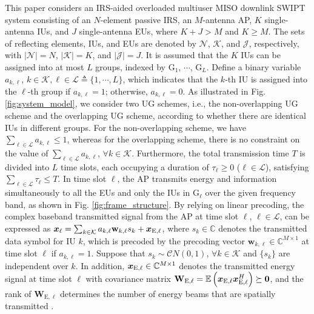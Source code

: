 \documentclass[12pt,draftclsnofoot, onecolumn]{IEEEtran}
\newcommand{\bm}[1]{\mbox{\boldmath{$#1$}}}
\theoremstyle{plain}
\begin{document}
\begin{sloppypar}
This paper considers an IRS-aided overloaded multiuser MISO downlink SWIPT system consisting of an $N$-element passive IRS, an $M$-antenna AP, $K$ single-antenna IUs, and $J$ single-antenna EUs, where $K + J > M$ and $K \geq M$. The sets of reflecting elements, IUs, and EUs are denoted by $\mathcal N$, $\mathcal K$, and $\mathcal J$, respectively, with $\left|\mathcal N\right| = N$, $\left|\mathcal K\right| = K$, and $\left|\mathcal J\right| = J$. It is assumed that the $K$ IUs can be assigned into at most $L$ groups, indexed by G$_1$, $\cdots$, G$_L$. Define a binary variable $a_{k,\ell}$, $k\in\mathcal K, \ell \in \mathcal L \triangleq \{1,\cdots,L\}$, which indicates that the $k$-th IU is assigned into the $\ell$-th group if $a_{k,\ell} = 1$; otherwise, $a_{k,\ell} = 0$. As illustrated in Fig. \ref{fig:system_model}, we consider two UG schemes, i.e., the non-overlapping UG scheme and the overlapping UG scheme, according to whether there are identical IUs in different groups. For the non-overlapping scheme, we have $\sum_{\ell \in\mathcal L} a_{k,\ell} \leq 1$, whereas for the overlapping scheme, there is no constraint on the value of $\sum_{\ell \in\mathcal L} a_{k,\ell}$, $ \forall k\in\mathcal K$. Furthermore, the total transmission time $T$ is divided into $L$ time slots, each occupying a duration of $\tau_\ell \geq 0$ ($\ell\in\mathcal L$), satisfying $\sum_{\ell \in\mathcal L}\tau_\ell \leq T$. In time slot $\ell$, the AP transmits energy and information simultaneously to all the EUs and only the IUs in G$_\ell$ over the given frequency band, as shown in Fig. \ref{fig:frame_structure}. By relying on linear precoding, the complex baseband transmitted signal from the AP at time slot $\ell$, $\ell\in\mathcal L$, can be expressed as $\bm x_\ell = \sum_{k\in\mathcal K}a_{k,\ell}\mathbf w_{k,\ell}s_{k} + \bm x_{\mathrm E,\ell}$, 
where $s_k \in\mathbb C$ denotes the transmitted data symbol for IU $k$, which is precoded by the precoding vector $\mathbf w_{k,\ell} \in\mathbb C^{M\times 1}$ at time slot $\ell$ if $a_{k,\ell} = 1$. Suppose that $s_k \sim \mathcal CN\left(0,1\right)$, $\forall k\in\mathcal K$ and $\{s_k\}$ are independent over $k$. In addition, $\bm x_{\mathrm E,\ell} \in\mathbb C^{M\times 1}$ denotes the transmitted energy signal at time slot $\ell$ with covariance matrix $\mathbf W_{\mathrm E,\ell} = \mathbb E\left(\bm x_{\mathrm E,\ell}\bm x^H_{\mathrm E,\ell}\right) \succeq \mathbf 0$, and the rank of $\mathbf W_{\mathrm E,\ell}$ determines the number of energy beams that are spatially transmitted \cite{2014_Jie_WPT}.    


\end{sloppypar}
\end{document}
